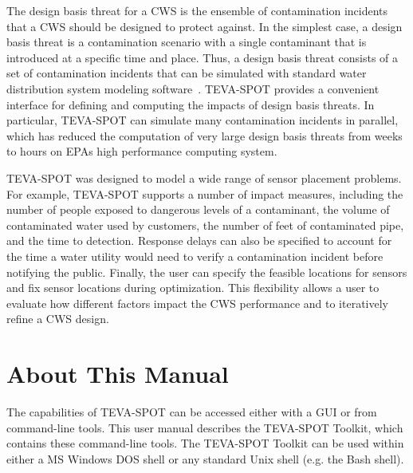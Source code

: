 The design basis threat for a CWS is the ensemble of contamination incidents that a CWS should be designed to protect against. In the simplest case, a design basis threat is a contamination scenario with a single contaminant that is introduced at a specific time and place. Thus, a design basis threat consists of a set of contamination incidents that can be simulated with standard water distribution system  modeling software~\cite{EPANET}.  TEVA-\/SPOT provides a convenient interface for defining and computing the impacts of design basis threats. In particular, TEVA-\/SPOT can simulate many contamination incidents in parallel, which has reduced the computation of very large design basis threats from weeks to hours on EPAs high performance computing system.

TEVA-\/SPOT was designed to model a wide range of sensor placement problems. For example, TEVA-\/SPOT supports a number of impact measures, including the number of people exposed to dangerous levels of a contaminant, the volume of contaminated water used by customers, the number of feet of contaminated pipe, and the time to detection. Response delays can also be specified to account for the time a water utility would need to verify a contamination incident before notifying the public. Finally, the user can specify the feasible locations for sensors and fix sensor locations during optimization. This flexibility allows a user to evaluate how different factors impact the CWS performance and to iteratively refine a CWS design.

\section{About This Manual}\label{intro_introAbout}
The capabilities of TEVA-\/SPOT can be accessed either with a GUI or from command-\/line tools. This user manual describes the TEVA-\/SPOT Toolkit, which contains these command-\/line tools. The TEVA-\/SPOT Toolkit can be used within either a MS Windows DOS shell or any standard Unix shell (e.g. the Bash shell).

